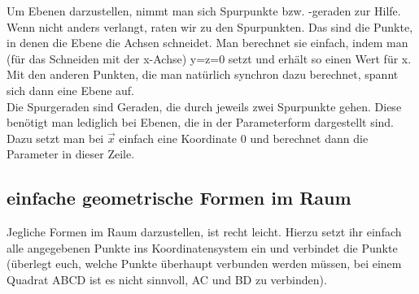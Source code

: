 Um Ebenen darzustellen, nimmt man sich Spurpunkte bzw. -geraden zur Hilfe. Wenn nicht anders verlangt, raten wir zu den Spurpunkten. Das sind die Punkte, in denen die Ebene die Achsen schneidet. Man berechnet sie einfach, indem man (für das Schneiden mit der x-Achse) y=z=0 setzt und erhält so einen Wert für x. Mit den anderen Punkten, die man natürlich synchron dazu berechnet, spannt sich dann eine Ebene auf.\\
Die Spurgeraden sind Geraden, die durch jeweils zwei Spurpunkte gehen. Diese benötigt man lediglich bei Ebenen, die in der Parameterform dargestellt sind. Dazu setzt man bei \(\vec{x}\) einfach eine Koordinate 0 und berechnet dann die Parameter in dieser Zeile.

\subsection{einfache geometrische Formen im Raum}
Jegliche Formen im Raum darzustellen, ist recht leicht. Hierzu setzt ihr einfach alle angegebenen Punkte ins Koordinatensystem ein und verbindet die Punkte (überlegt euch, welche Punkte überhaupt verbunden werden müssen, bei einem Quadrat ABCD ist es nicht sinnvoll, AC und BD zu verbinden).
